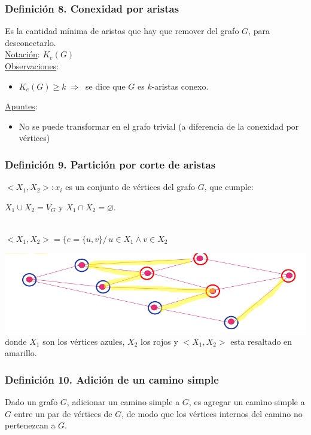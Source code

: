 \documentclass{article}
\newcommand{\tq}{/\,}                                   %
\newcommand{\Rightarrows}{\: \Rightarrow \:}            %
\begin{document}
\subsubsection*{Definición 8. Conexidad por aristas}
Es la cantidad mínima de aristas que hay que remover del grafo $G$, para desconectarlo. 
\\\underline{Notación}: $K_e(G)$
\\\underline{Observaciones}:
\begin{itemize}
    \item $K_e(G) \ge k \Rightarrows$ se dice que $G$ es $k$-aristas conexo.
\end{itemize}
\underline{Apuntes}:
\begin{itemize}
    \item No se puede transformar en el grafo trivial (a diferencia de la conexidad por vértices)
\end{itemize}

\subsubsection*{Definición 9. Partición por corte de aristas}
$<X_1, X_2> : x_i$ es un conjunto de vértices del grafo $G$, que cumple: 
\begin{center}
    $X_1 \cup X_2 = V_G$ y $X_1 \cap X_2 = \varnothing$.
\end{center}
\leavevmode\\$<X_1, X_2> = \{e = \{u,v\} \tq u \in X_1 \wedge v \in X_2$
\begin{center}
    \includegraphics[width=.70\textwidth]{particionCorteAristas.PNG}
    donde $X_1$ son los vértices azules, $X_2$ los rojos y $<X_1,X_2>$ esta resaltado en amarillo.
\end{center}

\subsubsection*{Definición 10. Adición de un camino simple}
Dado un grafo $G$, adicionar un camino simple a $G$, es agregar un camino simple a $G$ entre un par de vértices de $G$, de modo que los vértices internos del camino no pertenezcan a $G$. 
\end{document}
